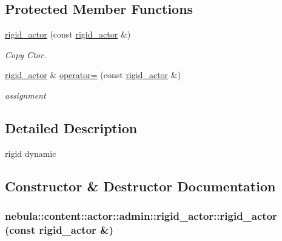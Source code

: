 \subsection*{Protected Member Functions}
\begin{DoxyCompactItemize}
\item 
\hyperlink{classnebula_1_1content_1_1actor_1_1admin_1_1rigid__actor_af4f105aca8ec7a66b55f1580bce7340c}{rigid\_\-actor} (const \hyperlink{classnebula_1_1content_1_1actor_1_1admin_1_1rigid__actor}{rigid\_\-actor} \&)
\begin{DoxyCompactList}\small\item\em Copy Ctor. \item\end{DoxyCompactList}\item 
\hyperlink{classnebula_1_1content_1_1actor_1_1admin_1_1rigid__actor}{rigid\_\-actor} \& \hyperlink{classnebula_1_1content_1_1actor_1_1admin_1_1rigid__actor_a633100102ba359becd477f46159270de}{operator=} (const \hyperlink{classnebula_1_1content_1_1actor_1_1admin_1_1rigid__actor}{rigid\_\-actor} \&)
\begin{DoxyCompactList}\small\item\em assignment \item\end{DoxyCompactList}\end{DoxyCompactItemize}


\subsection{Detailed Description}
rigid dynamic 

\subsection{Constructor \& Destructor Documentation}
\hypertarget{classnebula_1_1content_1_1actor_1_1admin_1_1rigid__actor_af4f105aca8ec7a66b55f1580bce7340c}{
\subsubsection[{rigid\_\-actor}]{\setlength{\rightskip}{0pt plus 5cm}nebula::content::actor::admin::rigid\_\-actor::rigid\_\-actor (const {\bf rigid\_\-actor} \&)}}
\label{classnebula_1_1content_1_1actor_1_1admin_1_1rigid__actor_af4f105aca8ec7a66b55f1580bce7340c}


